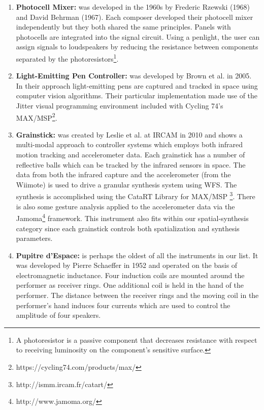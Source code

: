 \begin{enumerate}
    \item \textbf{Photocell Mixer:} was developed in the 1960s by Frederic Rzewski (1968) and David Behrman (1967). Each composer developed their photocell mixer independently but they both shared the same principles. Panels with photocells are integrated into the signal circuit. Using a penlight, the user can assign signals to loudspeakers by reducing the resistance between components separated by the photoresistors\footnote{A photoresistor is a passive component that decreases resistance with respect to receiving luminosity on the component's sensitive surface.}. 
    
    \item \textbf{Light-Emitting Pen Controller:} was developed by Brown et al. in 2005. In their approach light-emitting pens are captured and tracked in space using computer vision algorithms. Their particular implementation made use of the Jitter visual programming environment included with Cycling 74's MAX/MSP\footnote{https://cycling74.com/products/max/}. 
    
    \item \textbf{Grainstick:} was created by Leslie et al. at IRCAM in 2010 and shows a multi-modal approach to controller systems which employs both infrared motion tracking and accelerometer data. Each grainstick has a number of reflective balls which can be tracked by the infrared sensors in space. The data from both the infrared capture and the accelerometer (from the Wiimote) is used to drive a granular synthesis system using WFS. The synthesis is accomplished using the CataRT Library for MAX/MSP \footnote{http://ismm.ircam.fr/catart/}. There is also some gesture analysis applied to the accelerometer data via the Jamoma\footnote{http://www.jamoma.org/} framework. This instrument also fits within our spatial-synthesis category since each grainstick controls both spatialization and synthesis parameters.
    
    \item \textbf{Pupitre d'Espace:} is perhaps the oldest of all the instruments in our list. It was developed by Pierre Schaeffer in 1952 and operated on the basis of electromagnetic inductance. Four induction coils are mounted around the performer as receiver rings. One additional coil is held in the hand of the performer. The distance between the receiver rings and the moving coil in the performer's hand induces four currents which are used to control the amplitude of four speakers. 
    

\end{enumerate}
